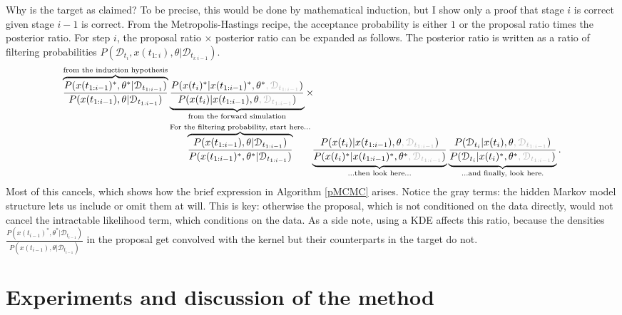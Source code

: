 \documentclass{article}
\newcommand\gray[1]{\textcolor{gray}{#1}}
\begin{document}
Why is the target as claimed? To be precise, this would be done by mathematical induction, but I show only a proof that stage $i$ is correct given stage $i-1$ is correct. From the Metropolis-Hastings recipe, the acceptance probability is either $1$ or the proposal ratio times the posterior ratio. For step $i$, the proposal ratio $\times$ posterior ratio can be expanded as follows. The posterior ratio is written as a ratio of filtering probabilities $P(\mathcal{D}_{t_{i}}, x(t_{1:i}), \theta|\mathcal{D}_{t_{i:i-1}})$.
\begin{align*}
\overbrace{\frac{P(x(t_{1:i-1})^*,\theta^*| \mathcal{D}_{t_{1:i-1}})}{P(x(t_{1:i-1}), \theta| \mathcal{D}_{t_{1:i-1}})}}^{\text{from the induction hypothesis}}
%
&\underbrace{\frac{P(x(t_{i})^*| x(t_{1:i-1})^*,\theta^*\gray{, \mathcal{D}_{t_{1:i-1}}})}{P(x(t_{i})| x(t_{1:i-1}), \theta \gray{, \mathcal{D}_{t_{1:i-1}}})}}_{\text{from the forward simulation}}
%
\times \\
%
&\overbrace{\frac{ P(x(t_{1:i-1}), \theta| \mathcal{D}_{t_{1:i-1}})}{ P( x(t_{1:i-1})^*,\theta^*| \mathcal{D}_{t_{1:i-1}})} }^{\text{For the filtering probability, start here...}}
%  
\underbrace{\frac{P(x(t_{i})| x(t_{1:i-1}), \theta \gray{, \mathcal{D}_{t_{1:i-1}}})}{P(x(t_{i})^*| x(t_{1:i-1})^*,\theta^*\gray{, \mathcal{D}_{t_{1:i-1}}})}}_{\text{...then look here...}}
%
\underbrace{\frac{P(\mathcal{D}_{t_{i}}|x(t_{i}), \theta\gray{, \mathcal{D}_{t_{1:i-1}}})}{P(\mathcal{D}_{t_{i}}|x(t_{i})^*, \theta^*\gray{, \mathcal{D}_{t_{1:i-1}}})}}_{\text{...and finally, look here.}}
%
.\end{align*} 
Most of this cancels, which shows how the brief expression in Algorithm \ref{pMCMC} arises. Notice the gray terms: the hidden Markov model structure lets us include or omit them at will. This is key: otherwise the proposal, which is not conditioned on the data directly, would not cancel the intractable likelihood term, which conditions on the data. As a side note, using a KDE affects this ratio, because the densities $\frac{P(x(t_{i-1})^*,\theta^*| \mathcal{D}_{t_{i-1}})}{P(x(t_{i-1}), \theta| \mathcal{D}_{t_{i-1}})}$ in the proposal get convolved with the kernel but their counterparts in the target do not.%

\section{Experiments and discussion of the method}
\end{document}
